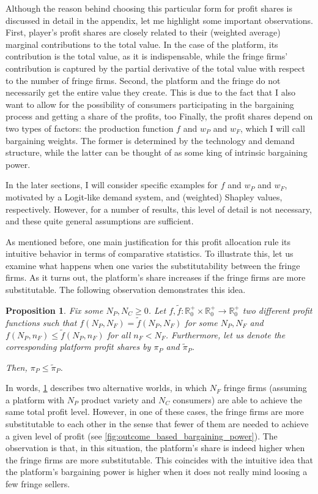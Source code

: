 \documentclass[a4paper]{article}
\newtheorem{proposition}{Proposition}
\begin{document}
Although the reason behind choosing this particular form for profit shares is discussed in detail in the appendix, let me highlight some important observations.
First, player's profit shares are closely related to their (weighted average) marginal contributions to the total value.
In the case of the platform, its contribution is the total value, as it is indispensable, while the fringe firms' contribution is captured by the partial derivative of the total value with respect to the number of fringe firms.
Second, the platform and the fringe do not necessarily get the entire value they create.
This is due to the fact that I also want to allow for the possibility of consumers participating in the bargaining process and getting a share of the profits, too
Finally, the profit shares depend on two types of factors: the production function $f$ and $w_P$ and $w_F$, which I will call bargaining weights.
The former is determined by the technology and demand structure, while the latter can be thought of as some king of intrinsic bargaining power.

In the later sections, I will consider specific examples for $f$ and $w_P$ and $w_F$, motivated by a Logit-like demand system, and (weighted) Shapley values, respectively.
However, for a number of results, this level of detail is not necessary, and these quite general assumptions are sufficient.

As mentioned before, one main justification for this profit allocation rule its intuitive behavior in terms of comparative statistics.
To illustrate this, let us examine what happens when one varies the substitutability between the fringe firms.
As it turns out, the platform's share increases if the fringe firms are more substitutable.
The following observation demonstrates this idea.
\begin{proposition}
    \label{prop:outcome_based_bargaining_power}
    Fix some $N_P, N_C \geq 0$. Let $f, \tilde{f}: \mathbb{R}^+_0 \times \mathbb{R}^+_0 \to \mathbb{R}^+_0$ two different profit functions such that $f(N_P, N_F) = \tilde{f}(N_P, N_F)$ for some $N_P, N_F$ and $f(N_P, n_F) \leq \tilde{f}(N_P, n_F)$ for all $n_F < N_F$.
    Furthermore, let us denote the corresponding platform profit shares by $\pi_P$ and $\tilde{\pi}_P$.
    
    Then, $\pi_P \leq \tilde{\pi}_P$.
\end{proposition}

In words, \cref{prop:outcome_based_bargaining_power} describes two alternative worlds, in which $N_F$ fringe firms (assuming a platform with $N_P$ product variety and $N_C$ consumers) are able to achieve the same total profit level.
However, in one of these cases, the fringe firms are more substitutable to each other in the sense that fewer of them are needed to achieve a given level of profit (see \cref{fig:outcome_based_bargaining_power}).
The observation is that, in this situation, the platform's share is indeed higher when the fringe firms are more substitutable.
This coincides with the intuitive idea that the platform's bargaining power is higher when it does not really mind loosing a few fringe sellers.
\end{document}
